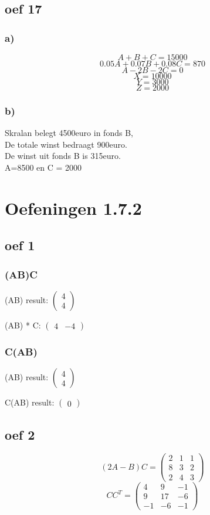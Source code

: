 \documentclass[lineaire_algebra_oplossingen.tex]{subfiles}
\begin{document}
\subsection{oef 17}
\subsubsection*{a)}
\[A + B + C = 15000\]
\[0.05A + 0.07B + 0.08C = 870\]
\[A-2B-2C=0\]
\[\]
\[X = 10000\]
\[Y = 3000\]
\[Z = 2000\]
\subsubsection*{b)}
Skralan belegt 4500euro in fonds B, \\
De totale winst bedraagt 900euro. \\
De winst uit fonds B is 315euro. \\
A=8500 en C = 2000


\section{Oefeningen 1.7.2}

\subsection{oef 1}
\subsubsection*{(AB)C}
(AB) result:
$
\begin{pmatrix}

4\\
4

\end{pmatrix}
$

(AB) * C:
$
\begin{pmatrix}
4 & -4
\end{pmatrix}
$

\subsubsection*{C(AB)}
(AB) result:
$
\begin{pmatrix}
4\\
4
\end{pmatrix}
$

C(AB) result:
$
\begin{pmatrix}
0
\end{pmatrix}
$

\subsection{oef 2}
\[(2A-B)C = 
\begin{pmatrix}
2 &  1 &  1\\
8 &  3 &  2\\
2 &  4 &  3
\end{pmatrix}
\]
\[ CC^T =
\begin{pmatrix}
4 &  9 &  -1\\
9 &  17 &  -6\\
-1 &  -6 &  -1
\end{pmatrix}
\]
\end{document}
